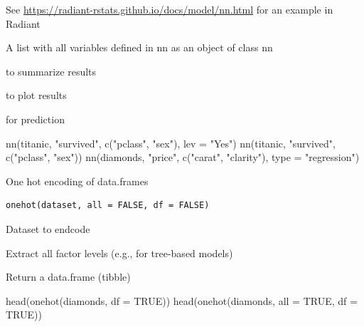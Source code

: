 \documentclass[a4paper]{book}
\begin{document}
%
\begin{Details}
See \url{https://radiant-rstats.github.io/docs/model/nn.html} for an example in Radiant
\end{Details}
%
\begin{Value}
A list with all variables defined in nn as an object of class nn
\end{Value}
%
\begin{SeeAlso}
 to summarize results

 to plot results

 for prediction
\end{SeeAlso}
%
\begin{Examples}
\begin{ExampleCode}
nn(titanic, "survived", c("pclass", "sex"), lev = "Yes") %
nn(titanic, "survived", c("pclass", "sex")) %
nn(diamonds, "price", c("carat", "clarity"), type = "regression") %
\end{ExampleCode}
\end{Examples}
%
\begin{Description}
One hot encoding of data.frames
\end{Description}
%
\begin{Usage}
\begin{verbatim}
onehot(dataset, all = FALSE, df = FALSE)
\end{verbatim}
\end{Usage}
%
\begin{Arguments}
\begin{ldescription}
\item[\code{dataset}] Dataset to endcode

\item[\code{all}] Extract all factor levels (e.g., for tree-based models)

\item[\code{df}] Return a data.frame (tibble)
\end{ldescription}
\end{Arguments}
%
\begin{Examples}
\begin{ExampleCode}
head(onehot(diamonds, df = TRUE))
head(onehot(diamonds, all = TRUE, df = TRUE))
\end{ExampleCode}
\end{Examples}
\end{document}
